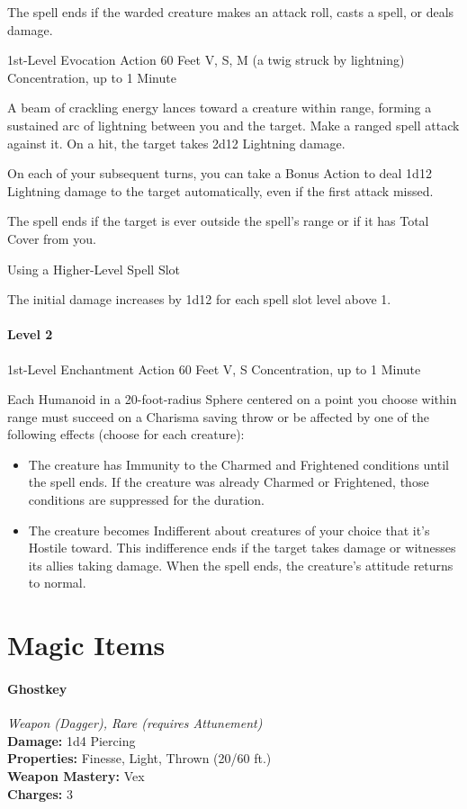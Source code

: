 \documentclass[letterpaper,openany,oneside,twocolumn]{book}
\begin{document}
The spell ends if the warded creature makes an attack roll, casts a spell, or deals damage.

	{1st-Level Evocation}
	{Action}
	{60 Feet}
	{V, S, M (a twig struck by lightning)}
	{Concentration, up to 1 Minute}

A beam of crackling energy lances toward a creature within range, forming a sustained arc of lightning between you and the target. Make a ranged spell attack against it. On a hit, the target takes 2d12 Lightning damage.

On each of your subsequent turns, you can take a Bonus Action to deal 1d12 Lightning damage to the target automatically, even if the first attack missed.

The spell ends if the target is ever outside the spell's range or if it has Total Cover from you.

\subparagraph*{Using a Higher-Level Spell Slot} The initial damage increases by 1d12 for each spell slot level above 1.

\subsection*{Level 2}

	{1st-Level Enchantment}
	{Action}
	{60 Feet}
	{V, S}
	{Concentration, up to 1 Minute}

Each Humanoid in a 20-foot-radius Sphere centered on a point you choose within range must succeed on a Charisma saving throw or be affected by one of the following effects (choose for each creature):
\begin{itemize}
	\item The creature has Immunity to the Charmed and Frightened conditions until the spell ends. If the creature was already Charmed or Frightened, those conditions are suppressed for the duration.
	\item The creature becomes Indifferent about creatures of your choice that it's Hostile toward. This indifference ends if the target takes damage or witnesses its allies taking damage. When the spell ends, the creature's attitude returns to normal.
\end{itemize}

\part*{Magic Items}

\subsection*{Ghostkey}
\textit{Weapon (Dagger), Rare (requires Attunement)}\\
\textbf{Damage:} 1d4 Piercing\\
\textbf{Properties:} Finesse, Light, Thrown (20/60 ft.)\\
\textbf{Weapon Mastery:} Vex\\
\textbf{Charges:} 3
\end{document}
